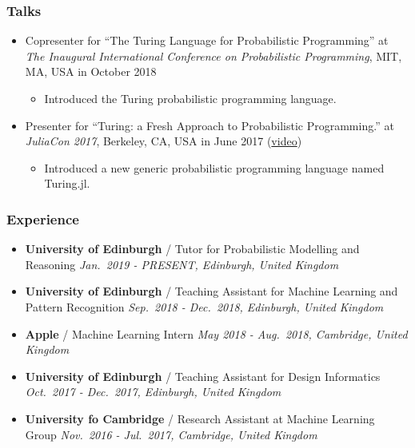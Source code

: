 \documentclass[11pt, a4paper]{article}
\providecommand{\tightlist}{%
  \setlength{\itemsep}{0pt}\setlength{\parskip}{0pt}}
\begin{document}
\begin{raggedright}
\subsubsection{Talks}

\begin{itemize}
\tightlist
\item
  Copresenter for ``The Turing Language for Probabilistic Programming''
  at \emph{The Inaugural International Conference on Probabilistic
  Programming}, MIT, MA, USA in October 2018

  \begin{itemize}
  \tightlist
  \item
    Introduced the Turing probabilistic programming language.
  \end{itemize}
\item
  Presenter for ``Turing: a Fresh Approach to Probabilistic
  Programming.'' at \emph{JuliaCon 2017}, Berkeley, CA, USA in June 2017
  (\href{https://www.youtube.com/watch?v=DJWNQg7uuCg}{video})

  \begin{itemize}
  \tightlist
  \item
    Introduced a new generic probabilistic programming language named
    Turing.jl.
  \end{itemize}
\end{itemize}

\subsubsection{Experience}

\begin{itemize}
\tightlist
\item
  \textbf{University of Edinburgh} / Tutor for Probabilistic Modelling
  and Reasoning \emph{Jan.~2019 - PRESENT, Edinburgh, United Kingdom}
\item
  \textbf{University of Edinburgh} / Teaching Assistant for Machine
  Learning and Pattern Recognition \emph{Sep.~2018 - Dec.~2018,
  Edinburgh, United Kingdom}
\item
  \textbf{Apple} / Machine Learning Intern \emph{May 2018 - Aug.~2018,
  Cambridge, United Kingdom}
\item
  \textbf{University of Edinburgh} / Teaching Assistant for Design
  Informatics \emph{Oct.~2017 - Dec.~2017, Edinburgh, United Kingdom}
\item
  \textbf{University fo Cambridge} / Research Assistant at Machine
  Learning Group \emph{Nov.~2016 - Jul.~2017, Cambridge, United Kingdom}
\end{itemize}


\end{raggedright}
\end{document}
